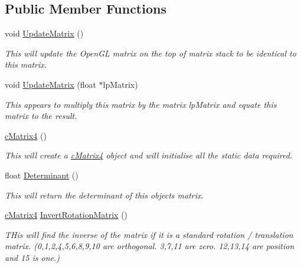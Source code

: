 \subsection*{Public Member Functions}
\begin{DoxyCompactItemize}
\item 
void \hyperlink{classc_matrix4_a072c31c505d176d93d73101c06084d9d}{UpdateMatrix} ()
\begin{DoxyCompactList}\small\item\em This will update the OpenGL matrix on the top of matrix stack to be identical to this matrix. \item\end{DoxyCompactList}\item 
void \hyperlink{classc_matrix4_a2c449ca9f08213ba86d53b04440ae210}{UpdateMatrix} (float $\ast$lpMatrix)
\begin{DoxyCompactList}\small\item\em This appears to multiply this matrix by the matrix lpMatrix and equate this matrix to the result. \item\end{DoxyCompactList}\item 
\hyperlink{classc_matrix4_a51d8e6bf6bbb6b998878fe978c748e14}{cMatrix4} ()
\begin{DoxyCompactList}\small\item\em This will create a \hyperlink{classc_matrix4}{cMatrix4} object and will initialise all the static data required. \item\end{DoxyCompactList}\item 
float \hyperlink{classc_matrix4_a39cf7cefa0672684e69eb4af89366270}{Determinant} ()
\begin{DoxyCompactList}\small\item\em This will return the determinant of this objects matrix. \item\end{DoxyCompactList}\item 
\hyperlink{classc_matrix4}{cMatrix4} \hyperlink{classc_matrix4_a7473299a57ffcfe284e6fd9005b98592}{InvertRotationMatrix} ()
\begin{DoxyCompactList}\small\item\em THis will find the inverse of the matrix if it is a standard rotation / translation matrix. (0,1,2,4,5,6,8,9,10 are orthogonal. 3,7,11 are zero. 12,13,14 are position and 15 is one.) \item\end{DoxyCompactList}\item 

\end{DoxyCompactItemize}
